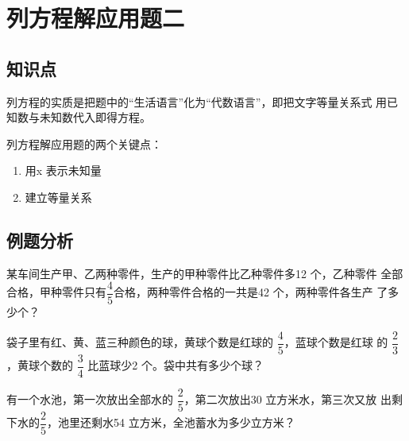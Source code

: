 \chapter{列方程解应用题二}
\section{知识点}
列方程的实质是把题中的“生活语言”化为“代数语言”，即把文字等量关系式
用已知数与未知数代入即得方程。\par
列方程解应用题的两个关键点：
\begin{enumerate}
    \item 用x 表示未知量
    \item 建立等量关系
\end{enumerate}
\vspace{-0.8cm}
\section{例题分析}
\begin{example}
    某车间生产甲、乙两种零件，生产的甲种零件比乙种零件多12 个，乙种零件
全部合格，甲种零件只有$\dfrac{4}{5}$合格，两种零件合格的一共是42 个，两种零件各生产
了多少个？
\end{example}
\vspace{3cm}
\begin{example}
    袋子里有红、黄、蓝三种颜色的球，黄球个数是红球的
$\dfrac{4}{5}$，蓝球个数是红球
的
$\dfrac{2}{3}$ ，黄球个数的
$\dfrac{3}{4}$ 比蓝球少2 个。袋中共有多少个球？
\end{example}
\vspace{3cm}
\begin{example}
    有一个水池，第一次放出全部水的
$\dfrac{2}{5}$，第二次放出30 立方米水，第三次又放
出剩下水的$\dfrac{2}{5}$，池里还剩水54 立方米，全池蓄水为多少立方米？
\end{example}
\vspace{3cm}
